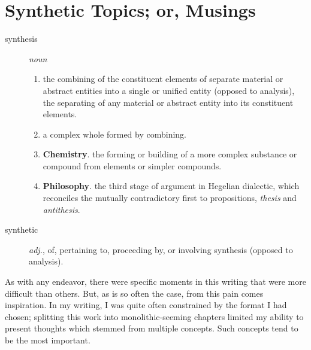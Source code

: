 \documentclass[../butidigress.tex]{subfiles}
\begin{document}
\chapter{Synthetic Topics; or, Musings}\label{chap:synthetic}
\newpage

\begin{description}
    \item [synthesis] \textit{noun}
    \begin{enumerate}
        \item the combining of the constituent elements of separate material or abstract entities into a single or unified entity (opposed to analysis), the separating of any material or abstract entity into its constituent elements.
        \item a complex whole formed by combining.
        \item \textbf{Chemistry}. the forming or building of a more complex substance or compound from elements or simpler compounds.
        \item \textbf{Philosophy}. the third stage of argument in Hegelian dialectic, which reconciles the mutually contradictory first to propositions, \emph{thesis} and \emph{antithesis}.
    \end{enumerate}
    \item [synthetic] \textit{adj.}, of, pertaining to, proceeding by, or involving synthesis (opposed to analysis).
\end{description}

As with any endeavor, there were specific moments in this writing that were more difficult than others.
But, as is so often the case, from this pain comes inspiration.
In my writing, I was quite often constrained by the format I had chosen; splitting this work into monolithic-seeming chapters limited my ability to present thoughts which stemmed from multiple concepts.
Such concepts tend to be the most important.
\end{document}
